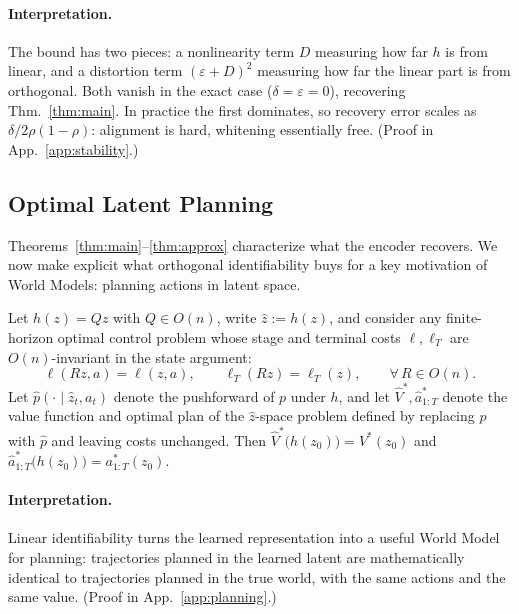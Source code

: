 \documentclass{article}
\makeatletter
\newcounter{thmcounter}
\renewcommand{\thethmcounter}{\arabic{thmcounter}}
\newcommand{\thmlabel}[1]{\protected@edef\@currentlabel{\thethmcounter}\label{#1}}
\makeatother
\begin{document}
\paragraph{Interpretation.}
The bound has two pieces: a nonlinearity term $D$ measuring how far $h$ is from linear, and a distortion term $(\varepsilon + D)^2$ measuring how far the linear part is from orthogonal. Both vanish in the exact case ($\delta = \varepsilon = 0$), recovering Thm.~\ref{thm:main}. In practice the first dominates, so recovery error scales as $\delta / 2\rho(1-\rho)$: alignment is hard, whitening essentially free. (Proof in App.~\ref{app:stability}.)




\subsection{Optimal Latent Planning}\label{sec:planning-equivalence}

Theorems~\ref{thm:main}--\ref{thm:approx} characterize what the encoder recovers. We now make explicit what orthogonal identifiability buys for a key motivation of World Models: planning actions in latent space.

\begin{theorembox}
\thmlabel{thm:planning}
Let $h(z) = Qz$ with $Q \in O(n)$, write $\hat z := h(z)$, and consider any finite-horizon optimal control problem whose stage and terminal costs $\ell, \ell_T$ are $O(n)$-invariant in the state argument:
\begin{equation}\label{eq:orth-inv-app}
    \ell(Rz, a) = \ell(z, a), \qquad \ell_T(Rz) = \ell_T(z), \qquad \forall\, R \in O(n).
\end{equation}
Let $\hat p(\cdot \mid \hat z_t, a_t)$ denote the pushforward of $p$ under $h$, and let $\hat V^*, \hat a^*_{1:T}$ denote the value function and optimal plan of the $\hat z$-space problem defined by replacing $p$ with $\hat p$ and leaving costs unchanged. Then $\hat V^*\!\big(h(z_0)\big) = V^*(z_0)$ and $\hat a^*_{1:T}\!\big(h(z_0)\big) = a^*_{1:T}(z_0)$.
\end{theorembox}

\paragraph{Interpretation.}
Linear identifiability turns the learned representation into a useful World Model for planning: trajectories planned in the learned latent are mathematically identical to trajectories planned in the true world, with the same actions and the same value.
(Proof in App.~\ref{app:planning}.)
\end{document}
